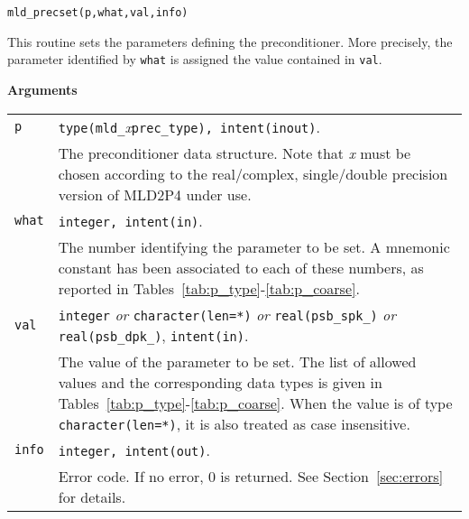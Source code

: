 \begin{center}
\verb|mld_precset(p,what,val,info)|\\
\end{center}

\noindent
This routine sets the parameters defining the preconditioner. More
precisely, the parameter identified by \verb|what| is assigned the value
contained in \verb|val|.

{\baselineskip\noindent\large\bfseries Arguments}

\begin{tabular}{p{1.2cm}p{12cm}}
\verb|p|      & \verb|type(mld_|\emph{x}\verb|prec_type), intent(inout)|.\\
              & The preconditioner data structure. Note that \emph{x} must
                be chosen according to the real/complex, single/double precision
                 version of MLD2P4 under use.\\
\verb|what|   & \verb|integer, intent(in)|. \\
              & The number identifying the parameter to be set.
                A mnemonic constant has been associated to each of these
                numbers, as reported in Tables~\ref{tab:p_type}-\ref{tab:p_coarse}.\\
\verb|val |   & \verb|integer| \emph{or} \verb|character(len=*)| \emph{or}
                \verb|real(psb_spk_)| \emph{or} \verb|real(psb_dpk_)|,
                \verb|intent(in)|.\\
              & The value of the parameter to be set. The list of allowed
                values and the corresponding data types is given in
                Tables~\ref{tab:p_type}-\ref{tab:p_coarse}.
                When the value is of type \verb|character(len=*)|,
                it is also treated as case insensitive.\\
\verb|info|   & \verb|integer, intent(out)|.\\
              & Error code. If no error, 0 is returned. See Section~\ref{sec:errors}
                for details.\\
%
\end{tabular}

